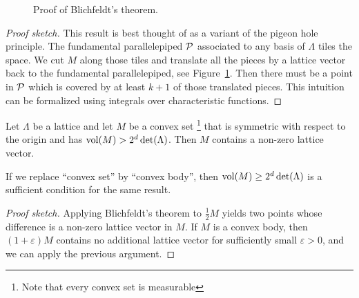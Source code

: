 \begin{figure}
\begin{center}
  \end{center}
  \caption{Proof of Blichfeldt's theorem.}
  \label{fig:blichfeldt-theorem}
\end{figure}
\begin{proof}[Proof sketch]
  This result is best thought of as a variant of the pigeon hole principle.
  The fundamental parallelepiped $\mathcal{P}$ associated to any basis of $\Lambda$
  tiles the space.
  We cut $M$ along those tiles and translate all the pieces by a lattice vector
  back to the fundamental parallelepiped,
  see Figure~\ref{fig:blichfeldt-theorem}.
  Then there must be a point in $\mathcal{P}$ which is covered by at least $k+1$ of those translated pieces.
  This intuition can be formalized using integrals over characteristic functions.
\end{proof}

\begin{theorem}
  \label{thm:minkowski-first}
  Let $\Lambda$ be a lattice
  and let $M$ be a convex set%
  \footnote{%
Note that every convex set is measurable
  }
  that is symmetric with respect to the origin
  and has $\operatorname{vol}(M) > 2^d \det(\Lambda)$.
  Then $M$ contains a non-zero lattice vector.

  If we replace ``convex set'' by ``convex body'',
  then $\operatorname{vol}(M) \geq 2^d \det(\Lambda)$ is a sufficient condition for the same result.
\end{theorem}
\begin{proof}[Proof sketch]
  Applying Blichfeldt's theorem to $\frac{1}{2} M$
  yields two points whose difference is a non-zero lattice vector in $M$.
  If $M$ is a convex body,
  then $(1 + \varepsilon) M$ contains no additional lattice vector for sufficiently small $\varepsilon > 0$,
  and we can apply the previous argument.
\end{proof}


